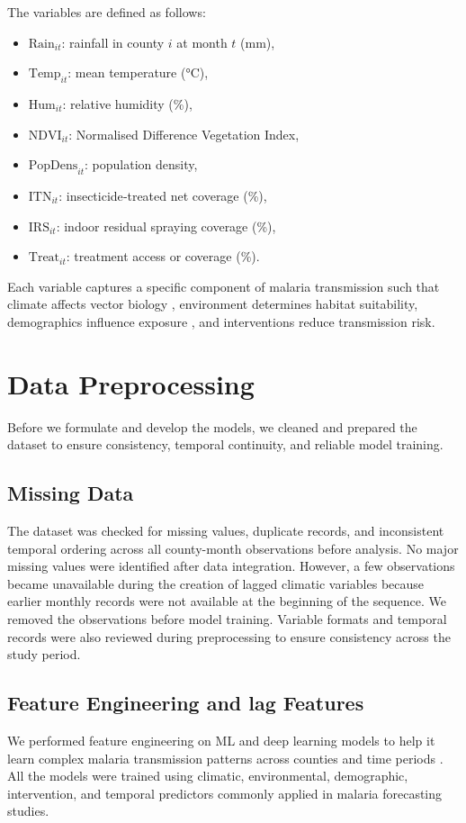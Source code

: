 The variables are defined as follows:
\begin{itemize}
	\item \(\text{Rain}_{it}\): rainfall in county \(i\) at month \(t\) (mm),
	\item \(\text{Temp}_{it}\): mean temperature (°C),
	\item \(\text{Hum}_{it}\): relative humidity (\%),
	\item \(\text{NDVI}_{it}\): Normalised Difference Vegetation Index,
	\item \(\text{PopDens}_{it}\): population density,
	\item \(\text{ITN}_{it}\): insecticide‑treated net coverage (\%),
	\item \(\text{IRS}_{it}\): indoor residual spraying coverage (\%),
	\item \(\text{Treat}_{it}\): treatment access or coverage (\%).
\end{itemize}

Each variable captures a specific component of malaria transmission such that climate affects vector biology \cite{Caminade2023}, environment determines habitat suitability, demographics influence exposure \cite{Chirebvu2014}, and interventions reduce transmission risk.


\section{Data Preprocessing}

Before we formulate and develop the models, we  cleaned and prepared  the dataset to ensure consistency, temporal continuity, and reliable model training.

\subsection{Missing Data}

The dataset was checked for missing values, duplicate records, and inconsistent temporal ordering across all county-month observations before analysis. No major missing values were identified after data integration. However, a few observations became unavailable during the creation of lagged climatic variables because earlier monthly records were not available at the beginning of the sequence. We removed  the observations before model training. Variable formats and temporal records were also reviewed during preprocessing to ensure consistency across the study period.

\subsection{Feature Engineering and lag Features}
\label{sec:feature_scaling}
\label{sec:lagged_features}
We performed feature engineering on ML and deep learning models to help it learn complex malaria transmission patterns across counties and time periods . All the models were trained using climatic, environmental, demographic, intervention, and temporal predictors commonly applied in malaria forecasting studies. 

